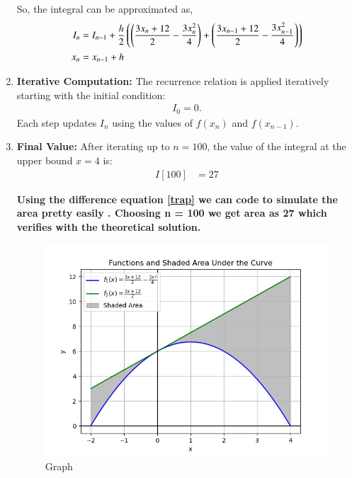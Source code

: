 \documentclass[journal]{IEEEtran}
\begin{document}
\begin{enumerate}
      So, the integral can be approximated as, 
    \begin{align}
    \label{trap}
    I_n &= I_{n-1} + \frac{h}{2} \left( \left(\frac{3x_n+12}{2} - \frac{3x_n^2}{4}\right) + \left(\frac{3x_{n-1}+12}{2} - \frac{3x_{n-1}^2}{4}\right)\right) \\ 
    x_n &= x_{n-1} + h
   \end{align}
    \item \textbf{Iterative Computation:}  
    The recurrence relation is applied iteratively starting with the initial condition:
    \begin{align}
    I_0 = 0.
    \end{align}
    Each step updates $I_n$ using the values of $f(x_n)$ and $f(x_{n-1})$. \\

    \item \textbf{Final Value:}  
    After iterating up to $n = 100$, the value of the integral at the upper bound $x = 4$ is:
    \begin{align}
    I[100] &= 27
    \end{align}

\textbf {Using the difference equation \eqref{trap} we can code to simulate the area pretty easily . Choosing n = 100 we get area as 27 which verifies with the theoretical solution.}

	 \begin{figure}[h]  %
    \centering  %
    \includegraphics[width=\columnwidth]{figs/Figure_1.png}  
    \caption{Graph}
    \label{fig:example}  %
\end{figure}
\end{enumerate}
\end{document}
